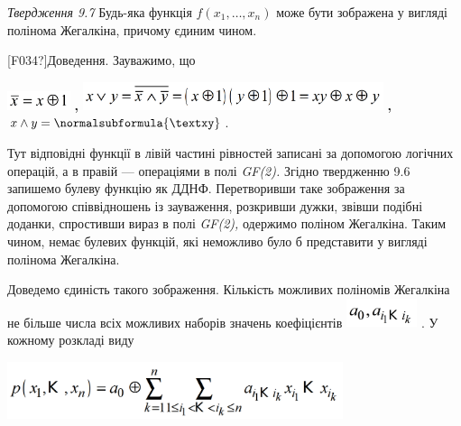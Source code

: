 \textit{Твердження 9.7}  Будь-яка функція 
$f(x_{1},\dots,x_n)$ може бути зображена у вигляді
полінома Жегалкіна, причому єдиним чином.

\textlatin{[F034?]}Доведення. Зауважимо, що 

{\centering
 \includegraphics[width=0.728in,height=0.2161in]{crypt-img/crypt-img119.png}
\textbf{, }
\includegraphics[width=3.4709in,height=0.3228in]{crypt-img/crypt-img120.png}
\textbf{,  } $x\wedge y=\normalsubformula{\textxy}$.
\par}

Тут відповідні функції в лівій частині рівностей записані за допомогою логічних
операцій, а в правій --- операціями в полі  \textit{GF(2).} Згідно твердженню
9.6\textit{ }запишемо\textit{ }булеву функцію як ДДНФ. Перетворивши таке
зображення за допомогою співвідношень із зауваження, розкривши дужки, звівши
подібні доданки, спростивши вираз  в полі \textit{GF(2)}\textit{, }одержимо
поліном Жегалкіна. Таким чином, немає булевих функцій, які неможливо було б
представити у вигляді полінома Жегалкіна.

Доведемо єдиність такого зображення. Кількість можливих поліномів Жегалкіна не
більше числа всіх можливих наборів значень коефіцієнтів 
\includegraphics[width=0.8154in,height=0.3307in]{crypt-img/crypt-img121.png} .
У кожному розкладі виду

{\centering 
\includegraphics[width=3.8752in,height=0.6661in]{crypt-img/crypt-img122.png}
\par}

